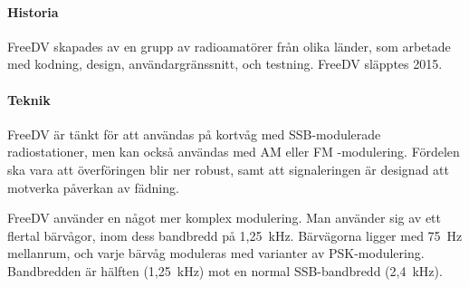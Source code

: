 \paragraph{Historia}

FreeDV skapades av en grupp av radioamatörer från olika länder, som arbetade
med kodning, design, användargränssnitt, och testning.
FreeDV släpptes 2015.

\paragraph{Teknik}

FreeDV är tänkt för att användas på kortvåg med SSB-modulerade radiostationer,
men kan också användas med AM eller FM -modulering.
Fördelen ska vara att överföringen blir ner robust, samt att signaleringen är
designad att motverka påverkan av fädning.

FreeDV använder en något mer komplex modulering.
Man använder sig av ett flertal bärvågor, inom dess bandbredd på 1,25~kHz.
Bärvägorna ligger med 75~Hz mellanrum, och varje bärvåg moduleras med varianter
av PSK-modulering.
Bandbredden är hälften (1,25~kHz) mot en normal SSB-bandbredd (2,4~kHz).
